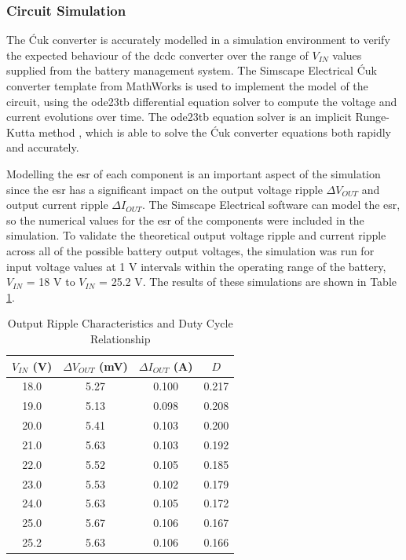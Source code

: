 \subsubsection{Circuit Simulation}

The Ćuk converter is accurately modelled in a simulation environment to verify the expected behaviour of the \acrshort{dcdc} converter over the range of $V_{IN}$ values supplied from the battery management system. The Simscape Electrical Ćuk converter template from MathWorks is used to implement the model of the circuit, using the ode23tb differential equation solver to compute the voltage and current evolutions over time. The ode23tb equation solver is an implicit Runge-Kutta method \cite{matlab_ode23tb}, which is able to solve the Ćuk converter equations both rapidly and accurately.

Modelling the \gls{esr} of each component is an important aspect of the simulation since the \acrshort{esr} has a significant impact on the output voltage ripple $\Delta V_{OUT}$ and output current ripple $\Delta I_{OUT}$. The Simscape Electrical software can model the \acrshort{esr}, so the numerical values for the \acrshort{esr} of the components were included in the simulation. To validate the theoretical output voltage ripple and current ripple across all of the possible battery output voltages, the simulation was run for input voltage values at 1 V intervals within the operating range of the battery, $V_{IN}$ = 18 V to $V_{IN}$ = 25.2 V. The results of these simulations are shown in Table \ref{tab:converter_performance}.

\begin{table}[h]
    \centering
    \renewcommand{\arraystretch}{1.2}
    \begin{tabular}{cccc}
        \toprule
        $V_{IN}$ (V) & $\Delta V_{OUT}$ (mV) & $\Delta I_{OUT}$ (A) & $D$ \\
        \midrule
        18.0 & 5.27 & 0.100 & 0.217 \\
        19.0 & 5.13 & 0.098 & 0.208 \\
        20.0 & 5.41 & 0.103 & 0.200 \\
        21.0 & 5.63 & 0.103 & 0.192 \\
        22.0 & 5.52 & 0.105 & 0.185 \\
        23.0 & 5.53 & 0.102 & 0.179 \\
        24.0 & 5.63 & 0.105 & 0.172 \\
        25.0 & 5.67 & 0.106 & 0.167 \\
        25.2 & 5.63 & 0.106 & 0.166 \\
        \bottomrule
    \end{tabular}
    \caption{Output Ripple Characteristics and Duty Cycle Relationship}
    \label{tab:converter_performance}
\end{table}


